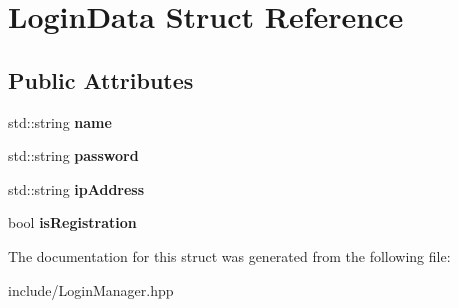 \hypertarget{struct_login_data}{\section{Login\-Data Struct Reference}
\label{struct_login_data}
}
\subsection*{Public Attributes}
\begin{DoxyCompactItemize}
\item 
\hypertarget{struct_login_data_ab7f4b952531641184a2474ccf9dfeae5}{std\-::string {\bfseries name}}\label{struct_login_data_ab7f4b952531641184a2474ccf9dfeae5}

\item 
\hypertarget{struct_login_data_a87a833421488f18487275ce099eba256}{std\-::string {\bfseries password}}\label{struct_login_data_a87a833421488f18487275ce099eba256}

\item 
\hypertarget{struct_login_data_a3b2813bde58c1ff54431e4f5543dcc1d}{std\-::string {\bfseries ip\-Address}}\label{struct_login_data_a3b2813bde58c1ff54431e4f5543dcc1d}

\item 
\hypertarget{struct_login_data_a42d8b72c2f0a06d46d1e514f0d8c22b4}{bool {\bfseries is\-Registration}}\label{struct_login_data_a42d8b72c2f0a06d46d1e514f0d8c22b4}

\end{DoxyCompactItemize}


The documentation for this struct was generated from the following file\-:\begin{DoxyCompactItemize}
\item 
include/Login\-Manager.\-hpp\end{DoxyCompactItemize}
